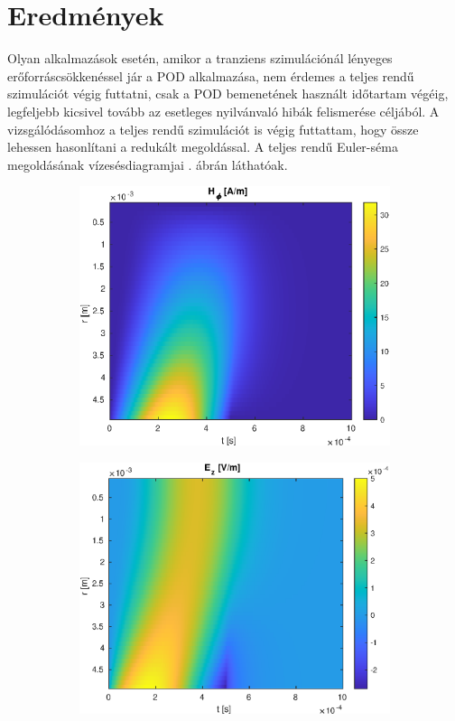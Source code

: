     \section{Eredmények}
        Olyan alkalmazások esetén, amikor a tranziens szimulációnál lényeges erőforráscsökkenéssel jár a POD alkalmazása, nem érdemes a teljes rendű szimulációt végig futtatni, csak a POD bemenetének használt időtartam végéig, legfeljebb kicsivel tovább az esetleges nyilvánvaló hibák felismerése céljából. A vizsgálódásomhoz a teljes rendű szimulációt is végig futtattam, hogy össze lehessen hasonlítani a redukált megoldással. A teljes rendű Euler-séma megoldásának vízesésdiagramjai . ábrán láthatóak.
        \begin{figure}[h]
            \centering
            \begin{subfigure}{0.48\textwidth}
                \includegraphics[width=\textwidth]{kep/euler_0.15_4_hphi_waterfall.eps}
            \end{subfigure}
            \begin{subfigure}{0.48\textwidth}
                \includegraphics[width=\textwidth]{kep/euler_0.15_4_ez_waterfall.eps}

\end{subfigure}
\end{figure}
